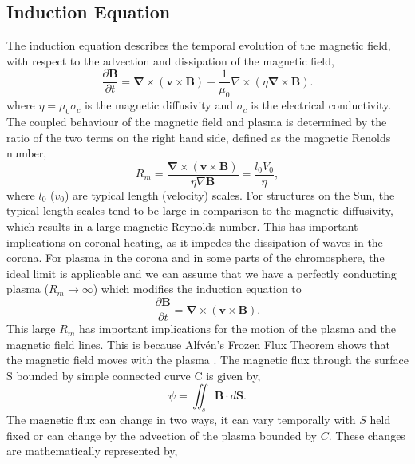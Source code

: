 \documentclass[12pt]{ociamthesis}
\newcommand{\bs}[1]{\boldsymbol{#1}}
\newcommand{\bn}{\boldsymbol{\nabla}}
\begin{document}
\subsection{Induction Equation}
\label{section:cont_eq}
The induction equation describes the temporal evolution of the magnetic field, with respect to the advection and dissipation of the magnetic field,
\begin{equation}\label{eq89}
\frac{\partial \boldsymbol{B}}{\partial t} = \bn \times (\boldsymbol{v} \times \boldsymbol{B}) - \frac{1}{\mu_0} \nabla \times (\eta \bn \times \boldsymbol{B}).
\end{equation}
where $\eta= \mu_0 \sigma_c$ is the magnetic diffusivity and $\sigma_c$ is the electrical conductivity. The coupled behaviour of the magnetic field and plasma is determined by the ratio of the two terms on the right hand side, defined as the magnetic Renolds number,
\begin{equation}
    R_m = \frac{\bn \times (\boldsymbol{v} \times \boldsymbol{B})}{\eta \nabla \bs{B}}=\frac{l_0 V_0}{\eta},
\end{equation}
where $l_0$ ($v_0$) are typical length (velocity) scales. For structures on the Sun, the typical length scales tend to be large in comparison to the magnetic diffusivity, which results in a large magnetic Reynolds number. This has important implications on coronal heating, as it impedes the dissipation of waves in the corona. For plasma in the corona and in some parts of the chromosphere, the ideal limit is applicable and we can assume that we have a perfectly conducting plasma ($R_m\to \infty$) which modifies the induction equation to
\begin{equation}\label{perf_induct}
\frac{\partial \boldsymbol{B}}{\partial t} = \bn \times (\boldsymbol{v} \times \boldsymbol{B}).
\end{equation}
This large $R_m$ has important implications for the motion of the plasma and the magnetic field lines. This is because Alfv\'{e}n's Frozen Flux Theorem shows that the magnetic field moves with the plasma \citep{priest2014magnetohydrodynamics}. The magnetic flux through the surface S bounded by simple connected curve C is given by,
\begin{equation}
    \psi = \iint_s \bs{B} \cdot d\bs{S}.
\end{equation}
The magnetic flux can change in two ways, it can vary temporally with $S$ held fixed or can change by the advection of the plasma bounded by $C$. These changes are mathematically represented by,
\end{document}
